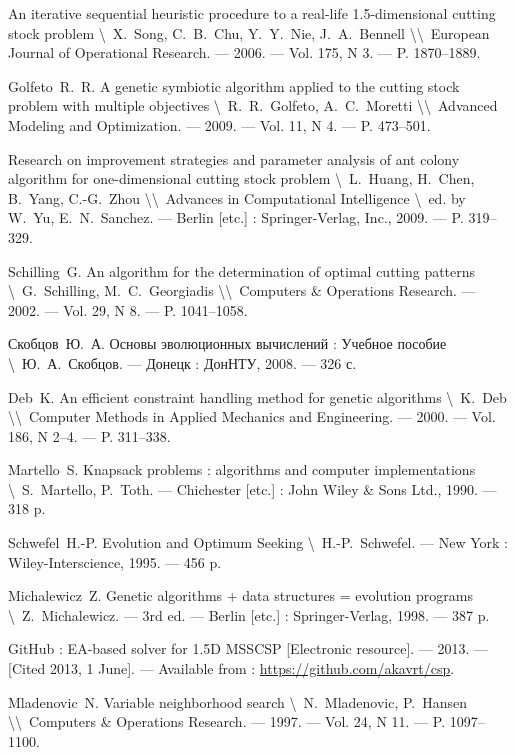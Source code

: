\documentclass[12pt]{article}
\begin{document}
\begin{thebibliography}{00}
 An iterative sequential heuristic procedure to a real-life 
1.5-dimensional cutting stock problem 
\textbackslash~X.~Song, C.~B.~Chu, Y.~Y.~Nie, J.~A.~Bennell 
\textbackslash\textbackslash~European Journal of Operational Research. 
--- 2006. --- Vol. 175, N 3. --- P. 1870--1889.

 Golfeto~R.~R. A genetic symbiotic algorithm applied to 
the cutting stock problem with multiple objectives 
\textbackslash~R.~R.~Golfeto, A.~C.~Moretti 
\textbackslash\textbackslash~Advanced Modeling and Optimization. 
--- 2009. --- Vol. 11, N 4. --- P. 473--501.

 Research on improvement strategies and parameter analysis 
of ant colony algorithm for one-dimensional cutting stock problem 
\textbackslash~L.~Huang, H.~Chen, B.~Yang, C.-G.~Zhou
\textbackslash\textbackslash~Advances in Computational Intelligence 
\textbackslash~ed. by W.~Yu, E.~N.~Sanchez. 
--- Berlin [etc.] : Springer-Verlag, Inc., 2009. --- P. 319--329.

 Schilling~G. An algorithm for the determination of 
optimal cutting patterns 
\textbackslash~G.~Schilling, M.~C.~Georgiadis 
\textbackslash\textbackslash~Computers \& Operations Research. 
--- 2002. --- Vol. 29, N 8. --- P. 1041--1058.

 Скобцов~Ю.~А. Основы эволюционных вычислений : Учебное 
пособие
\textbackslash~Ю.~А.~Скобцов.
--- Донецк : ДонНТУ, 2008. --- 326 с.

 Deb~K. An efficient constraint handling method for genetic 
algorithms 
\textbackslash~K.~Deb 
\textbackslash\textbackslash~Computer Methods in Applied Mechanics and Engineering. 
--- 2000. --- Vol. 186, N 2--4. --- P. 311--338.

 Martello~S. Knapsack problems : algorithms and computer 
implementations 
\textbackslash~S.~Martello, P.~Toth. 
--- Chichester [etc.] : John Wiley \& Sons Ltd., 1990. --- 318 p.

 Schwefel~H.-P. Evolution and Optimum Seeking 
\textbackslash~H.-P.~Schwefel. 
--- New York : Wiley-Interscience, 1995. --- 456 p.

 Michalewicz~Z. Genetic algorithms + data structures = 
evolution programs 
\textbackslash~Z.~Michalewicz. 
--- 3rd ed. --- Berlin [etc.] : Springer-Verlag, 1998. --- 387 p.

 GitHub : EA-based solver for 1.5D MSSCSP [Electronic resource]. 
--- 2013. --- [Cited 2013, 1 June]. 
--- Available from : \url{https://github.com/akavrt/csp}.

 Mladenovic~N. Variable neighborhood search 
\textbackslash~N.~Mladenovic, P.~Hansen 
\textbackslash\textbackslash~Computers \& Operations Research. 
--- 1997. --- Vol. 24, N 11. --- P. 1097--1100.
\end{thebibliography}
\end{document}
